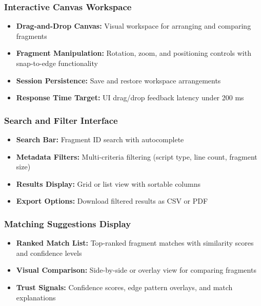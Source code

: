 \documentclass[12pt, titlepage]{article}
\begin{document}
\subsubsection{Interactive Canvas Workspace}
\begin{itemize}
    \item \textbf{Drag-and-Drop Canvas:} Visual workspace for arranging and comparing fragments
    \item \textbf{Fragment Manipulation:} Rotation, zoom, and positioning controls with snap-to-edge functionality
    \item \textbf{Session Persistence:} Save and restore workspace arrangements
    \item \textbf{Response Time Target:} UI drag/drop feedback latency under 200 ms
\end{itemize}

\subsubsection{Search and Filter Interface}
\begin{itemize}
    \item \textbf{Search Bar:} Fragment ID search with autocomplete
    \item \textbf{Metadata Filters:} Multi-criteria filtering (script type, line count, fragment size)
    \item \textbf{Results Display:} Grid or list view with sortable columns
    \item \textbf{Export Options:} Download filtered results as CSV or PDF
\end{itemize}

\subsubsection{Matching Suggestions Display}
\begin{itemize}
    \item \textbf{Ranked Match List:} Top-ranked fragment matches with similarity scores and confidence levels
    \item \textbf{Visual Comparison:} Side-by-side or overlay view for comparing fragments
    \item \textbf{Trust Signals:} Confidence scores, edge pattern overlays, and match explanations
\end{itemize}
\end{document}
